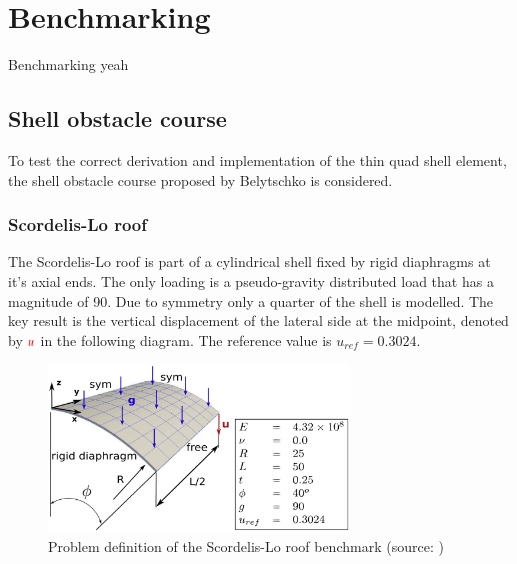 


\renewcommand{\Thema}{Benchmarking}



\chapter{Benchmarking}

Benchmarking yeah

\section{Shell obstacle course}

To test the correct derivation and implementation of the thin quad shell element, the shell obstacle course proposed by Belytschko \cite{Bel85} is considered.

\subsection{Scordelis-Lo roof}

The Scordelis-Lo roof is part of a cylindrical shell fixed by rigid diaphragms at it's axial ends. The only loading is a pseudo-gravity distributed load that has a magnitude of 90. Due to symmetry only a quarter of the shell is modelled. The key result is the vertical displacement of the lateral side at the midpoint, denoted by $\textcolor{red}{u}$ in the following diagram. The reference value is $u_{ref} = 0.3024$.

\begin{figure}[H]
	\centering
	\def\svgwidth{\columnwidth}
	\includegraphics[width=8cm]{images/scordelisroof.png}
	\caption{Problem definition of the Scordelis-Lo roof benchmark (source: \cite{Bou13})}
	\label{scordelisroof}
\end{figure}


